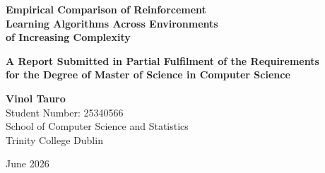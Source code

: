 \documentclass[a4paper,12pt]{article}
\begin{document}

\begin{titlepage}
\centering
\vspace*{2cm}

{\Huge\bfseries\color{tcdBlue}
Empirical Comparison of Reinforcement\\[0.3em]
Learning Algorithms Across Environments\\[0.3em]
of Increasing Complexity
\par}

\vspace{1.5cm}

{\large\bfseries
A Report Submitted in Partial Fulfilment of the Requirements\\
for the Degree of Master of Science in Computer Science
\par}

\vspace{2cm}

{\large
\textbf{Vinol Tauro}\\[0.3em]
Student Number: 25340566\\[0.3em]
School of Computer Science and Statistics\\
Trinity College Dublin
\par}

\vspace{2cm}

{\large June 2026\par}

\end{titlepage}
\end{document}

